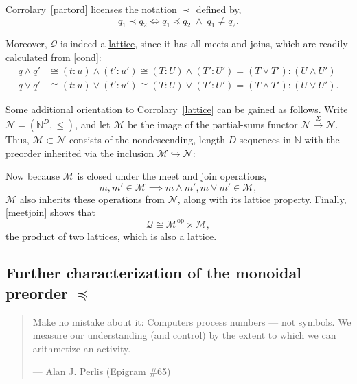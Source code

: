 \documentclass{article}
\newcommand{\N}{\mathbb{N}}
\newcommand{\Q}{\ensuremath{\mathcal{Q}}}
\newcommand{\M}{\ensuremath{\mathcal{M}}}
\DeclareMathOperator{\dual}{op}
\begin{document}
\begin{nota}
  Corrolary~\ref{partord} licenses the notation $\prec$ defined by,
  $$
  q_1 \prec q_2 \iff q_1 \preceq q_2 \;\wedge\; q_1 \neq q_2.
  $$
\end{nota}

\begin{corr}\label{lattice}
  Moreover, $\Q$ is indeed a \underline{lattice}, since it has all meets and joins, which are readily calculated from \eqref{cond}:
  \begin{equation}\label{meetjoin}
    \begin{aligned}
    q \wedge q' & \cong (t\!:\!u) \wedge (t'\!:\!u') \cong
    (T\!:\!U) \wedge (T'\!:\!U') = (T\!\vee\!T'):(U\!\wedge\!U')
    \\
    q \vee q' & \cong (t\!:\!u) \vee (t'\!:\!u') \cong
    (T\!:\!U) \vee (T'\!:\!U') = (T\!\wedge\!T'):(U\!\vee\!U').
    \end{aligned}
  \end{equation}
\end{corr}

Some additional orientation to Corrolary~\ref{lattice} can be gained as follows.  Write $\mathcal{N} = (\N^D,\le)$, and let $\M$ be the image of the partial-sums functor $\mathcal{N} \xrightarrow{\Sigma} \mathcal{N}$.  Thus, $\M \subset \mathcal{N}$ consists of the nondescending, length-$D$ sequences in $\N$ with the preorder inherited via the inclusion $\M \hookrightarrow \mathcal{N}$:
\begin{center}
\end{center}
Now because $\M$ is closed under the meet and join operations,
$$
m, m' \in \M \implies m \wedge m', m \vee m' \in \M,
$$
$\M$ also inherits these operations from $\mathcal{N}$, along with its lattice property.  Finally, \eqref{meetjoin} shows that
$$
\Q \cong \M^{\dual} \times \M,
$$
the product of two lattices, which is also a lattice.

\subsection{Further characterization of the monoidal preorder $\preceq$}

\begin{quote}
  Make no mistake about it: Computers process numbers --- not symbols.
  We measure our understanding (and control) by the extent to which
  we can arithmetize an activity.
  
  \hfill --- Alan J. Perlis (Epigram \#65)
\end{quote}
\end{document}
